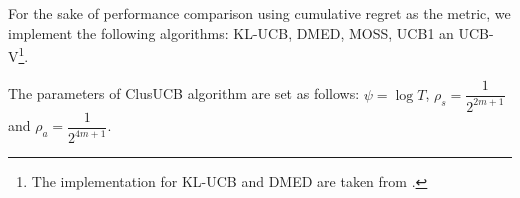 %
%
%
%
%
%
%
%


For the sake of performance comparison using cumulative regret as the metric, we implement the following algorithms:  KL-UCB\cite{garivier2011kl}, DMED\cite{honda2010asymptotically}, MOSS\cite{audibert2009minimax}, UCB1\cite{auer2002finite} an UCB-V\cite{audibert2009exploration}\footnote{The implementation for KL-UCB and DMED are taken from \cite{CapGarKau12}.}.

The parameters of ClusUCB algorithm are set as follows: $\psi=\log T$, $\rho_{s}=\dfrac{1}{2^{2m+1}}$ and $\rho_{a}=\dfrac{1}{2^{4m+1}}$.

